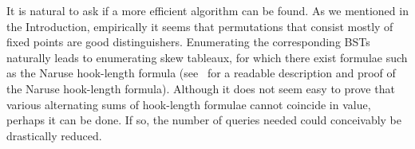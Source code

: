 \documentclass[12pt]{article}
\theoremstyle{definition}
\begin{document}
It is natural to ask if a more efficient algorithm can be found.
As we mentioned in the Introduction,
empirically it seems that permutations that consist mostly of fixed points
are good distinguishers.
Enumerating the corresponding BSTs naturally leads
to enumerating skew tableaux,
for which there exist formulae
such as the Naruse hook-length formula
(see~\cite{morales-pak-panova} for a readable description and proof
of the Naruse hook-length formula).
Although it does not seem easy to prove that
various alternating sums of hook-length formulae
cannot coincide in value, perhaps it can be done.
If so, the number of queries needed could conceivably be drastically reduced.



\end{document}
